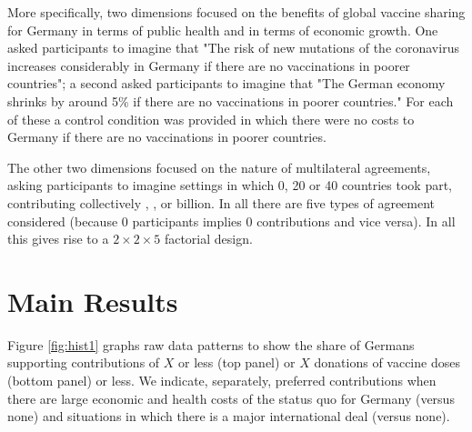 \documentclass[12pt,oneside]{article}
\begin{document}
More specifically, two dimensions focused on the benefits of global vaccine sharing for Germany in terms of public health and in terms of economic growth. One asked participants to imagine that "The risk of new mutations of the coronavirus increases considerably in Germany if there are no vaccinations in poorer countries"; a second asked participants to imagine that "The German economy shrinks by around 5\% if there are no vaccinations in poorer countries." For each of these a control condition was provided in which there were no costs to Germany if there are no vaccinations in poorer countries.



The other two dimensions focused on the nature of multilateral agreements, asking participants to imagine settings in which 0, 20 or 40 countries took part, contributing collectively , , or  billion. In all there are five types of agreement considered (because 0 participants implies 0 contributions and vice versa). In all this gives rise to a $2\times2\times5$ factorial design. 
 

%
% 


\section*{Main Results}
\label{sec:results}



Figure \ref{fig:hist1} graphs raw data patterns to show the share of Germans supporting contributions of \texteuro $X$ or less (top panel) or $X$ donations of vaccine doses (bottom panel) or less. We indicate, separately, preferred contributions when there are large economic and health costs of the status quo for Germany (versus none) and situations in which there is a major international deal (versus none).
\end{document}
